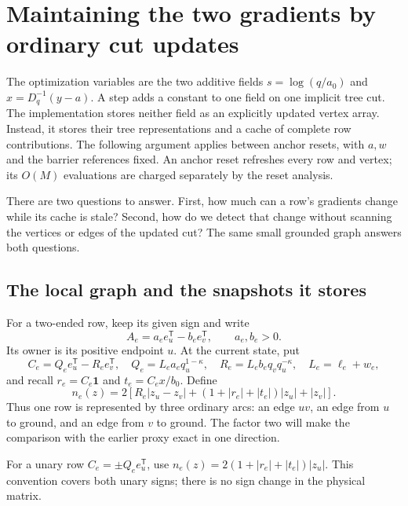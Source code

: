 \documentclass[11pt]{article}
\theoremstyle{definition}\newtheorem{definition}[theorem]{Definition}
\theoremstyle{remark}\newtheorem{remark}[theorem]{Remark}
\begin{document}

\section{Maintaining the two gradients by ordinary cut updates}
\label{sec:maintenance}

The optimization variables are the two additive fields
$s=\log(q/a_0)$ and $x=D_q^{-1}(y-a)$. A step adds a constant to one field on
one implicit tree cut. The implementation stores neither field as an
explicitly updated vertex array. Instead, it stores their tree
representations and a cache of complete row contributions.
The following argument applies between anchor resets, with $a,w$ and
the barrier references fixed. An anchor reset refreshes every row and
vertex; its $O(M)$ evaluations are charged separately by the reset
analysis.

There are two questions to answer. First, how much can a row's gradients
change while its cache is stale? Second, how do we detect that change
without scanning the vertices or edges of the updated cut? The same
small grounded graph answers both questions.

\subsection{The local graph and the snapshots it stores}

For a two-ended row, keep its given sign and write
\[
 A_e=a_e e_u^{\mathsf T}-b_e e_v^{\mathsf T},\qquad a_e,b_e>0.
\]
Its owner is its positive endpoint $u$. At the current state, put
\[
 C_e=Q_e e_u^{\mathsf T}-R_e e_v^{\mathsf T},\quad
 Q_e=L_ea_eq_u^{1-\kappa},\quad
 R_e=L_eb_eq_vq_u^{-\kappa},\quad
 L_e=\ell_e+w_e,
\]
and recall $r_e=C_e\mathbf1$ and $t_e=C_ex/b_0$. Define
\begin{equation}
 n_e(z)=2\left[
 R_e|z_u-z_v|+(1+|r_e|+|t_e|)|z_u|+|z_v|
 \right].
 \label{maint:localnorm}
\end{equation}
Thus one row is represented by three ordinary arcs: an edge $uv$, an
edge from $u$ to ground, and an edge from $v$ to ground. The factor two
will make the comparison with the earlier proxy exact in one direction.

For a unary row $C_e=\pm Q_e e_u^{\mathsf T}$, use
$n_e(z)=2(1+|r_e|+|t_e|)|z_u|$. This convention covers both unary signs;
there is no sign change in the physical matrix.
\end{document}
